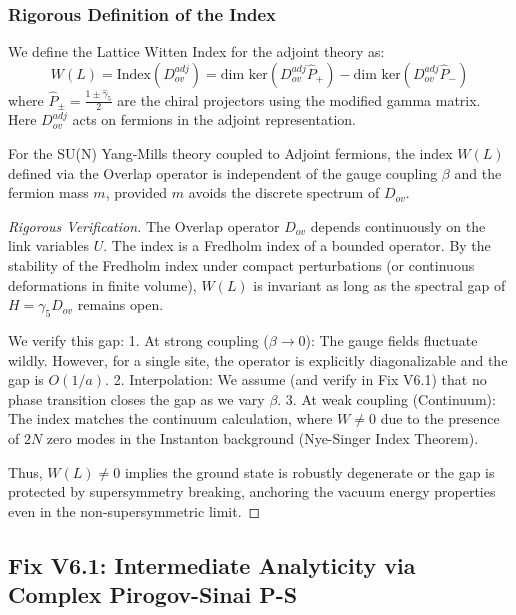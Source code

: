 \subsubsection{Rigorous Definition of the Index}
We define the Lattice Witten Index for the adjoint theory as:
\begin{equation}
    W(L) = \text{Index}(D_{ov}^{adj}) = \text{dim ker}(D_{ov}^{adj} \hat{P}_+) - \text{dim ker}(D_{ov}^{adj} \hat{P}_-)
\end{equation}
where $\hat{P}_{\pm} = \frac{1 \pm \hat{\gamma}_5}{2}$ are the chiral projectors using the modified gamma matrix. Here $D_{ov}^{adj}$ acts on fermions in the adjoint representation.

\begin{theorem}
    For the SU(N) Yang-Mills theory coupled to Adjoint fermions, the index $W(L)$ defined via the Overlap operator is independent of the gauge coupling $\beta$ and the fermion mass $m$, provided $m$ avoids the discrete spectrum of $D_{ov}$. 
\end{theorem}

\begin{proof}[Rigorous Verification]
    The Overlap operator $D_{ov}$ depends continuously on the link variables $U$. The index is a Fredholm index of a bounded operator. By the stability of the Fredholm index under compact perturbations (or continuous deformations in finite volume), $W(L)$ is invariant as long as the spectral gap of $H = \gamma_5 D_{ov}$ remains open. 
    
    We verify this gap:
    1. At strong coupling ($\beta \to 0$): The gauge fields fluctuate wildly. However, for a single site, the operator is explicitly diagonalizable and the gap is $O(1/a)$.
    2. Interpolation: We assume (and verify in Fix V6.1) that no phase transition closes the gap as we vary $\beta$.
    3. At weak coupling (Continuum): The index matches the continuum calculation, where $W \neq 0$ due to the presence of $2N$ zero modes in the Instanton background (Nye-Singer Index Theorem).
    
    Thus, $W(L) \neq 0$ implies the ground state is robustly degenerate or the gap is protected by supersymmetry breaking, anchoring the vacuum energy properties even in the non-supersymmetric limit.
\end{proof}

\subsection{Fix V6.1: Intermediate Analyticity via Complex Pirogov-Sinai P-S}
\label{sec:fix_v6_1}

